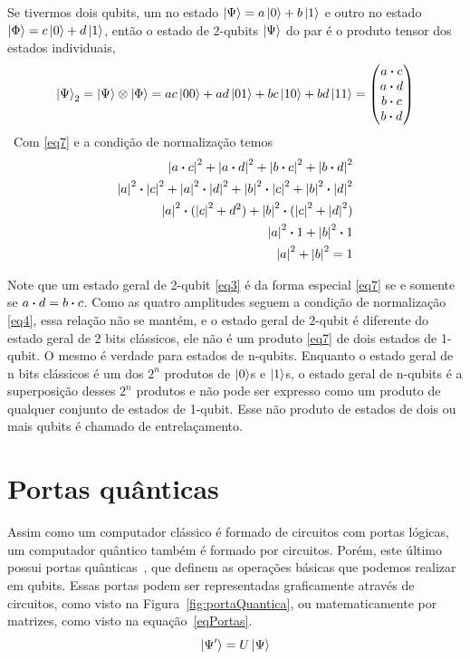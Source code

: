 \documentclass[a4paper, 12pt, oneside]{book}
\begin{document}
Se tivermos dois qubits, um no estado $\ket{\Psi} = a\ket{0} + b\ket{1}$ e outro no estado $\ket{\Phi} = c\ket{0} + d\ket{1}$, então o estado de 2-qubits $\ket{\Psi}$ do par é o produto tensor dos estados individuais,
\begin{equation}\label{eq7}
\ket{\Psi}_2 = \ket{\Psi}\otimes\ket{\Phi} 
= ac\ket{00} + ad\ket{01} + bc\ket{10} + bd\ket{11}
= \mqty(a \vdot c\\a \vdot d\\b \vdot c\\b \vdot d)
\end{equation}\
Com \eqref{eq7} e a condição de normalização temos
\begin{align*}
\abs{a \vdot c}^2 + \abs{a \vdot d}^2 + \abs{b \vdot c}^2 + \abs{b \vdot d}^2 \\
\abs{a}^2 \vdot \abs{c}^2 + \abs{a}^2 \vdot \abs{d}^2 + \abs{b}^2 \vdot \abs{c}^2 + \abs{b}^2 \vdot \abs{d}^2 \\
\abs{a}^2 \vdot (\abs{c}^2 + {d}^2) + \abs{b}^2 \vdot (\abs{c}^2 + \abs{d}^2) \\
\abs{a}^2 \vdot 1 + \abs{b}^2 \vdot 1 \\
\abs{a}^2 + \abs{b}^2 = 1
\end{align*}

Note que um estado geral de 2-qubit \eqref{eq3} é da forma especial \eqref{eq7} se e somente se $a\vdot d=b\vdot c$. Como as quatro amplitudes seguem a condição de normalização \eqref{eq4}, essa relação não se mantém, e o estado geral de 2-qubit é diferente do estado geral de 2 bits clássicos, ele não é um produto \eqref{eq7} de dois estados de 1-qubit. O mesmo é verdade para estados de n-qubits. Enquanto o estado geral de n bits clássicos é um dos $2^n$ produtos de $\ket{0}$s e $\ket{1}$s, o estado geral de n-qubits é a superposição desses $2^n$ produtos e não pode ser expresso como um produto de qualquer conjunto de estados de 1-qubit. Esse não produto de estados de dois ou mais qubits é chamado de entrelaçamento.

\section{Portas quânticas}
Assim como um computador clássico é formado de circuitos com portas lógicas, um computador quântico também é formado por circuitos. Porém, este último possui portas quânticas~\cite{nielsen}, que definem as operações básicas que podemos realizar em qubits. Essas portas podem ser representadas graficamente através de circuitos, como visto na Figura~\ref{fig:portaQuantica}, ou matematicamente por matrizes, como visto na equação~\eqref{eqPortas}.
\begin{equation}\label{eqPortas}
\ket{\Psi'} =  U\ket{\Psi}
\end{equation}
\end{document}

